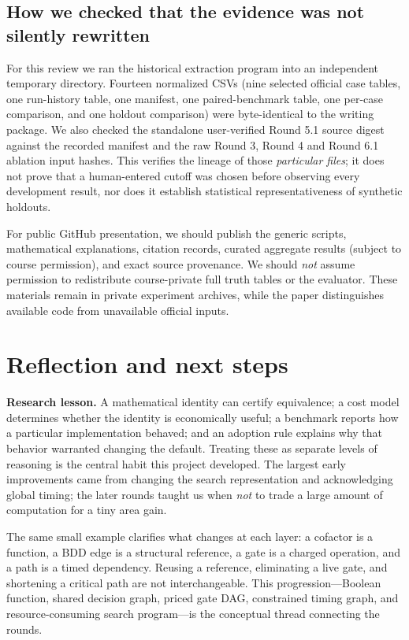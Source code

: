 \documentclass[a4paper,10pt]{article}
\theoremstyle{definition}
\theoremstyle{remark}
\begin{document}
\subsection{How we checked that the evidence was not silently rewritten}
For this review we ran the historical extraction program into an independent temporary directory. Fourteen normalized CSVs (nine selected official case tables, one run-history table, one manifest, one paired-benchmark table, one per-case comparison, and one holdout comparison) were byte-identical to the writing package. We also checked the standalone user-verified Round 5.1 source digest against the recorded manifest and the raw Round 3, Round 4 and Round 6.1 ablation input hashes. This verifies the lineage of those \emph{particular files}; it does not prove that a human-entered cutoff was chosen before observing every development result, nor does it establish statistical representativeness of synthetic holdouts.

For public GitHub presentation, we should publish the generic scripts, mathematical explanations, citation records, curated aggregate results (subject to course permission), and exact source provenance. We should \emph{not} assume permission to redistribute course-private full truth tables or the evaluator. These materials remain in private experiment archives, while the paper distinguishes available code from unavailable official inputs.


\section{Reflection and next steps}
\textbf{Research lesson.} A mathematical identity can certify equivalence; a cost model determines whether the identity is economically useful; a benchmark reports how a particular implementation behaved; and an adoption rule explains why that behavior warranted changing the default. Treating these as separate levels of reasoning is the central habit this project developed. The largest early improvements came from changing the search representation and acknowledging global timing; the later rounds taught us when \emph{not} to trade a large amount of computation for a tiny area gain.

The same small example clarifies what changes at each layer: a cofactor is a function, a BDD edge is a structural reference, a gate is a charged operation, and a path is a timed dependency. Reusing a reference, eliminating a live gate, and shortening a critical path are not interchangeable. This progression---Boolean function, shared decision graph, priced gate DAG, constrained timing graph, and resource-consuming search program---is the conceptual thread connecting the rounds.
\end{document}
